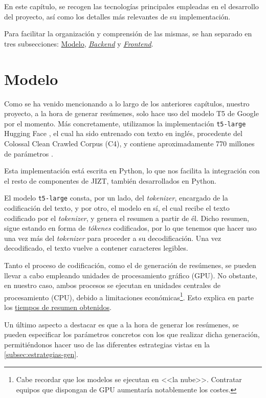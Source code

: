  \label{chapter:tecnicas}

En este capítulo, se recogen las tecnologías principales empleadas en el desarrollo del proyecto, así como los detalles más relevantes de su implementación.

Para facilitar la organización y comprensión de las mismas, se han separado en tres subsecciones: \hyperref[sec:model]{Modelo}, \hyperref[sec:backend]{\emph{Backend}} y \hyperref[sec:frontend]{\emph{Frontend}}.


\section{Modelo} \label{sec:model}

Como se ha venido mencionando a lo largo de los anteriores capítulos, nuestro proyecto, a la hora de generar resúmenes, solo hace uso del modelo T5 de Google \cite{raffel19} por el momento. Más concretamente, utilizamos la implementación \texttt{t5-large} Hugging Face \cite{t5-hf}, el cual ha sido entrenado con texto en inglés, procedente del Colossal Clean Crawled Corpus (C4), y contiene aproximadamente 770 millones de parámetros \cite{hf-pretrained}.

Esta implementación está escrita en Python, lo que nos facilita la integración con el resto de componentes de JIZT, también desarrollados en Python.

El modelo \texttt{t5-large} consta, por un lado, del \emph{tokenizer}, encargado de la codificación del texto, y por otro, el modelo en sí, el cual recibe el texto codificado por el \emph{tokenizer}, y genera el resumen a partir de él. Dicho resumen, sigue estando en forma de \emph{tókenes} codificados, por lo que tenemos que hacer uso una vez más del \emph{tokenizer} para proceder a su decodificación. Una vez decodificado, el texto vuelve a contener caracteres legibles.

Tanto el proceso de codificación, como el de generación de resúmenes, se pueden llevar a cabo empleando unidades de procesamiento gráfico (GPU). No obstante, en nuestro caso, ambos procesos se ejecutan en unidades centrales de procesamiento (CPU), debido a limitaciones económicas\footnote{Cabe recordar que los modelos se ejecutan en <<la nube>>. Contratar equipos que dispongan de GPU aumentaría notablemente los costes.}. Esto explica en parte los \hyperref[table:comparativa]{tiempos de resumen obtenidos}.

Un último aspecto a destacar es que a la hora de generar los resúmenes, se pueden especificar los parámetros concretos con los que realizar dicha generación, permitiéndonos hacer uso de las diferentes estrategias vistas en la \autoref{subsec:estrategias-gen}.

